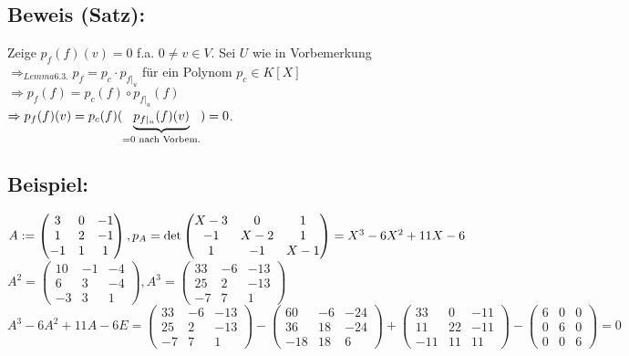 \documentclass[a4paper, 12pt]{extarticle}
\newcommand{\tn}[1]{\textnormal {#1}}
\begin{document}
\subsection*{Beweis (Satz):}
Zeige $p_f(f)(v) = 0$ f.a. $0\neq v \in V$. Sei $U$ wie in Vorbemerkung\\
$\Rightarrow_{Lemma 6.3.} p_f = p_c \cdot p_{f|_u}$ für ein Polynom $p_c \in K[X]$\\
$\Rightarrow p_f(f) = p_c(f) \circ p_{f|_u}(f)$\\
$\Rightarrow p_f(f)(v) = p_c(f)(\underbrace{p_{f|_u}(f)(v)}_{=0\tn{ nach Vorbem.}}) = 0$.
\subsection*{Beispiel:}
$A:= \left(\begin{matrix}
	3 & 0 & -1\\
	1 & 2 & -1\\
	-1 & 1 & 1
\end{matrix}\right), p_A = \tn{det}\left(\begin{matrix}
X-3 & 0 & 1\\
-1 & X-2 & 1\\
1 & -1 & X-1
\end{matrix}\right) = X^3-6X^2+11X-6$\\
$A^2=\left(\begin{matrix}
	10 & -1 & -4\\
	6 & 3 & -4\\
	-3 & 3 & 1
\end{matrix}\right), A^3 = \left(\begin{matrix}
33 & -6 & -13\\
25 & 2 & -13\\
-7 & 7 & 1
\end{matrix}\right)$\\
$A^3-6A^2+11A-6E = \left(\begin{matrix}
	33 & -6 & -13\\
	25 & 2 & -13\\
	-7 & 7 & 1
\end{matrix}\right) - \left(\begin{matrix}
60 & -6 & -24\\
36 & 18 & -24\\
-18 & 18 & 6
\end{matrix}\right) + \left(\begin{matrix}
33 & 0 & -11\\
11 & 22 & -11\\
-11 & 11 & 11
\end{matrix}\right) - \left(\begin{matrix}
6 & 0 & 0\\
0 & 6 & 0\\
0 & 0 & 6
\end{matrix}\right) = 0$\\
\end{document}
